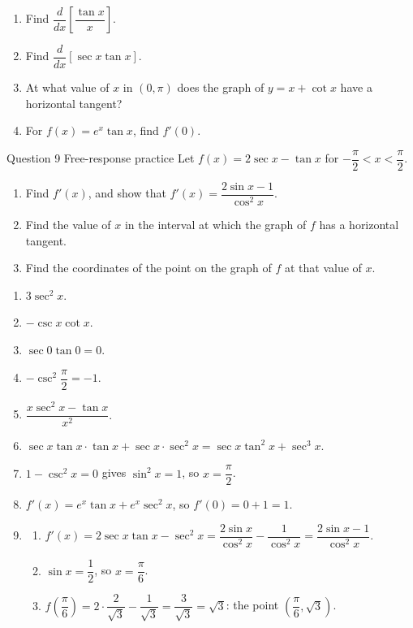 \documentclass[11pt]{article}
\begin{document}
\begin{enumerate}[leftmargin=*,itemsep=2pt,start=5]
  \item Find $\dfrac{d}{dx}\left[\dfrac{\tan x}{x}\right]$.\work{2.8cm}
  \item Find $\dfrac{d}{dx}[\sec x\tan x]$.\work{2.8cm}
  \item At what value of $x$ in $(0,\pi)$ does the graph of $y=x+\cot x$ have a horizontal tangent?\work{2.8cm}
  \item For $f(x)=e^{x}\tan x$, find $f'(0)$.\work{2.8cm}
\end{enumerate}

\begin{frbox}{Question 9 \textperiodcentered{} Free-response practice}
Let $f(x)=2\sec x-\tan x$ for $-\dfrac\pi2<x<\dfrac\pi2$.
\begin{enumerate}[label=(\alph*),leftmargin=*,itemsep=2pt]
  \item Find $f'(x)$, and show that $f'(x)=\dfrac{2\sin x-1}{\cos^2x}$.\work{2.6cm}
  \item Find the value of $x$ in the interval at which the graph of $f$ has a horizontal tangent.\work{2.6cm}
  \item Find the coordinates of the point on the graph of $f$ at that value of $x$.\work{2.6cm}
\end{enumerate}
\end{frbox}

\newpage
\begin{solbox}
\begin{enumerate}[leftmargin=*,itemsep=4pt]
  \item $3\sec^2x$.
  \item $-\csc x\cot x$.
  \item $\sec0\tan0=0$.
  \item $-\csc^2\dfrac\pi2=-1$.
  \item $\dfrac{x\sec^2x-\tan x}{x^2}$.
  \item $\sec x\tan x\cdot\tan x+\sec x\cdot\sec^2x=\sec x\tan^2x+\sec^3x$.
  \item $1-\csc^2x=0$ gives $\sin^2x=1$, so $x=\dfrac\pi2$.
  \item $f'(x)=e^{x}\tan x+e^{x}\sec^2x$, so $f'(0)=0+1=1$.
  \item \begin{enumerate}[label=(\alph*),leftmargin=*,itemsep=3pt]
    \item $f'(x)=2\sec x\tan x-\sec^2x=\dfrac{2\sin x}{\cos^2x}-\dfrac{1}{\cos^2x}=\dfrac{2\sin x-1}{\cos^2x}$.
    \item $\sin x=\dfrac12$, so $x=\dfrac\pi6$.
    \item $f\!\left(\dfrac\pi6\right)=2\cdot\dfrac{2}{\sqrt3}-\dfrac{1}{\sqrt3}=\dfrac{3}{\sqrt3}=\sqrt3$: the point $\left(\dfrac\pi6,\sqrt3\right)$.
  \end{enumerate}
\end{enumerate}
\end{solbox}
\end{document}
